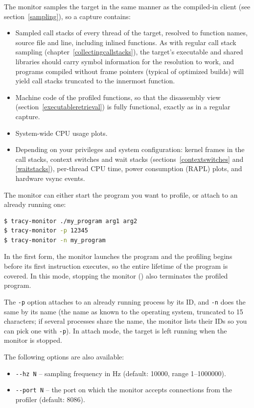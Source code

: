 \documentclass[hidelinks,titlepage,a4paper,twoside]{article}
\begin{document}
The monitor samples the target in the same manner as the compiled-in client (see section~\ref{sampling}), so a capture contains:

\begin{itemize}
\item Sampled call stacks of every thread of the target, resolved to function names, source file and line, including inlined functions. As with regular call stack sampling (chapter~\ref{collectingcallstacks}), the target's executable and shared libraries should carry symbol information for the resolution to work, and programs compiled without frame pointers (typical of optimized builds) will yield call stacks truncated to the innermost function.
\item Machine code of the profiled functions, so that the disassembly view (section~\ref{executableretrieval}) is fully functional, exactly as in a regular capture.
\item System-wide CPU usage plots.
\item Depending on your privileges and system configuration: kernel frames in the call stacks, context switches and wait stacks (sections~\ref{contextswitches} and \ref{waitstacks}), per-thread CPU time, power consumption (RAPL) plots, and hardware vsync events.
\end{itemize}

The monitor can either start the program you want to profile, or attach to an already running one:

\begin{lstlisting}[language=sh]
$ tracy-monitor ./my_program arg1 arg2
$ tracy-monitor -p 12345
$ tracy-monitor -n my_program
\end{lstlisting}

In the first form, the monitor launches the program and the profiling begins before its first instruction executes, so the entire lifetime of the program is covered. In this mode, stopping the monitor () also terminates the profiled program.

The \texttt{-p} option attaches to an already running process by its ID, and \texttt{-n} does the same by its name (the name as known to the operating system, truncated to 15 characters; if several processes share the name, the monitor lists their IDs so you can pick one with \texttt{-p}). In attach mode, the target is left running when the monitor is stopped.

The following options are also available:

\begin{itemize}
\item \texttt{-{}-hz N} -- sampling frequency in Hz (default: 10000, range 1--1000000).
\item \texttt{-{}-port N} -- the port on which the monitor accepts connections from the profiler (default: 8086).
\end{itemize}
\end{document}
